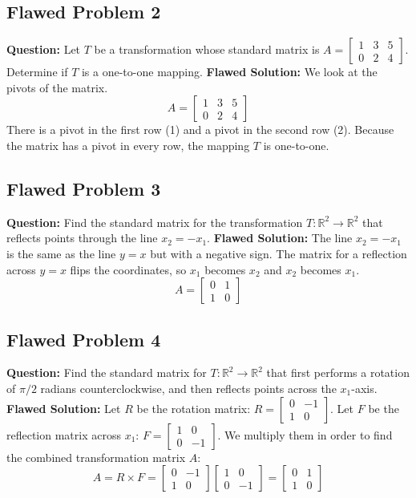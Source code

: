 \documentclass[11pt]{article}
\begin{document}
\subsection*{Flawed Problem 2}
\textbf{Question:} Let $T$ be a transformation whose standard matrix is $A = \begin{bmatrix} 1 & 3 & 5 \\ 0 & 2 & 4 \end{bmatrix}$. Determine if $T$ is a one-to-one mapping.
\textbf{Flawed Solution:} 
We look at the pivots of the matrix. 
\[ A = \begin{bmatrix} 1 & 3 & 5 \\ 0 & 2 & 4 \end{bmatrix} \]
There is a pivot in the first row (1) and a pivot in the second row (2). Because the matrix has a pivot in every row, the mapping $T$ is one-to-one.

\vspace{2cm}
\subsection*{Flawed Problem 3}
\textbf{Question:} Find the standard matrix for the transformation $T: \mathbb{R}^2 \to \mathbb{R}^2$ that reflects points through the line $x_2 = -x_1$.
\textbf{Flawed Solution:}
The line $x_2 = -x_1$ is the same as the line $y = x$ but with a negative sign. The matrix for a reflection across $y = x$ flips the coordinates, so $x_1$ becomes $x_2$ and $x_2$ becomes $x_1$.
\[ A = \begin{bmatrix} 0 & 1 \\ 1 & 0 \end{bmatrix} \]

\vspace{2cm}
\subsection*{Flawed Problem 4}
\textbf{Question:} Find the standard matrix for $T: \mathbb{R}^2 \to \mathbb{R}^2$ that first performs a rotation of $\pi/2$ radians counterclockwise, and then reflects points across the $x_1$-axis.
\textbf{Flawed Solution:}
Let $R$ be the rotation matrix: $R = \begin{bmatrix} 0 & -1 \\ 1 & 0 \end{bmatrix}$.
Let $F$ be the reflection matrix across $x_1$: $F = \begin{bmatrix} 1 & 0 \\ 0 & -1 \end{bmatrix}$.
We multiply them in order to find the combined transformation matrix $A$:
\[ A = R \times F = \begin{bmatrix} 0 & -1 \\ 1 & 0 \end{bmatrix} \begin{bmatrix} 1 & 0 \\ 0 & -1 \end{bmatrix} = \begin{bmatrix} 0 & 1 \\ 1 & 0 \end{bmatrix} \]
\end{document}
